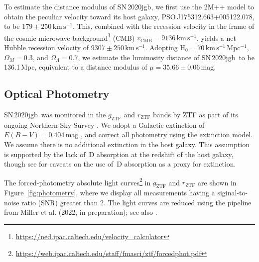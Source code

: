 \documentclass[twocolumn]{aastex631}
\newcommand{\sn}{SN\,2020jgb}
\newcommand{\kms}{$\mathrm{km}\,\mathrm{s}^{-1}$}
\begin{document}
To estimate the distance modulus of \sn, we first use the 2M++ model \citep{Carrick2015_2M++} to obtain the peculiar velocity toward its host galaxy, PSO\,J175312.663+005122.078, to be $179\pm250$\,\kms. This, combined with the recession velocity in the frame of the cosmic microwave background\footnote{\url{https://ned.ipac.caltech.edu/velocity_calculator}} (CMB) $v_\mathrm{CMB}=9136$\,\kms, yields a net Hubble recession velocity of $9307\pm250$\,\kms. Adopting H$_0=70$\,\kms\,Mpc$^{-1}$, $\Omega_M=0.3$, and $\Omega_\Lambda=0.7$, we estimate the luminosity distance of \sn\ to be 136.1\,Mpc, equivalent to a distance modulus of $\mu=35.66\pm0.06$\,mag.

\subsection{Optical Photometry}
\sn\ was monitored in the $g_\mathrm{ZTF}$ and $r_\mathrm{ZTF}$ bands by ZTF as part of its ongoing Northern Sky Survey \citep{Bellm_2019}. We adopt a Galactic extinction of $E(B-V)=0.404\,$mag \citep{Schlafly2011}, and correct all photometry using the \citet{Fitzpatrick1999} extinction model. We assume there is no additional extinction in the host galaxy. This assumption is supported by the lack of \,D absorption at the redshift of the host galaxy, though see \citet{Poznanski_2011} for caveats on the use of \,D absorption as a proxy for extinction. 

The forced-photometry absolute light curves\footnote{\url{https://web.ipac.caltech.edu/staff/fmasci/ztf/forcedphot.pdf}} in $g_\mathrm{ZTF}$ and $r_\mathrm{ZTF}$ are shown in Figure~\ref{fig:photometry}, where we display all measurements having a siginal-to-noise ratio (SNR) greater than 2. The light curves are reduced using the pipeline from Miller et al. (2022, in preparation); see also \citet{Yao_2019}.
\end{document}
